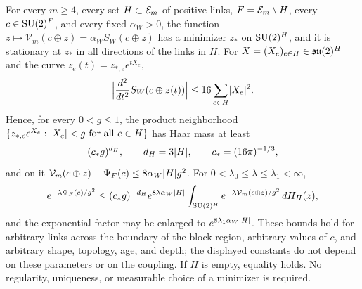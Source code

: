 \begin{lemma}\label{ch19:lem:compact-wilson-completion}
For every $m\ge4$, every set $H\subset\mathcal E_{m}$ of positive links, $F=\mathcal E_{m}\setminus H$, every $c\in\mathrm{SU}(2)^F$, and every fixed $\alpha_W>0$, the function $z\mapsto\mathcal V_m(c\oplus z)=\alpha_WS_W(c\oplus z)$ has a minimizer $z_*$ on $\mathrm{SU}(2)^H$, and it is stationary at $z_*$ in all directions of the links in $H$. For $X=(X_e)_{e\in H}\in\mathfrak{su}(2)^H$ and the curve $z_e(t)=z_{*,e}e^{tX_e}$,
\[
 \Bigl\lvert\frac{d^2}{dt^2}S_W(c\oplus z(t))\Bigr\rvert\le16\sum_{e\in H}\lvert X_e\rvert^2.
\]
Hence, for every $0<g\le1$, the product neighborhood $\{z_{*,e}e^{X_e}:\lvert X_e\rvert<g\text{ for all }e\in H\}$ has Haar mass at least
\[
 (c_*g)^{d_H},\qquad d_H=3\lvert H\rvert,\qquad c_*=(16\pi)^{-1/3},
\]
and on it $\mathcal V_m(c\oplus z)-\Psi_F(c)\le8\alpha_W\lvert H\rvert g^2$. For $0<\lambda_0\le\lambda\le\lambda_1<\infty$,
\[
 e^{-\lambda\Psi_F(c)/g^2}\le(c_*g)^{-d_H}e^{8\lambda\alpha_W\lvert H\rvert}
 \int_{\mathrm{SU}(2)^H}e^{-\lambda\mathcal V_m(c\oplus z)/g^2}\,dH_H(z),
\]
and the exponential factor may be enlarged to $e^{8\lambda_1\alpha_W\lvert H\rvert}$. These bounds hold for arbitrary links across the boundary of the block region, arbitrary values of $c$, and arbitrary shape, topology, age, and depth; the displayed constants do not depend on these parameters or on the coupling. If $H$ is empty, equality holds. No regularity, uniqueness, or measurable choice of a minimizer is required.
\end{lemma}


